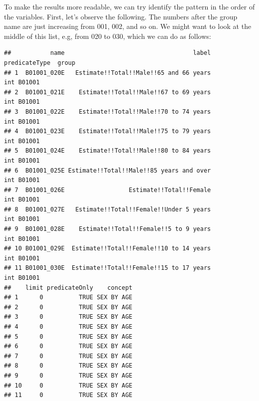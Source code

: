 \documentclass[openany]{book}
\newenvironment{Shaded}{\begin{snugshade}}{\end{snugshade}}
\newcommand{\DecValTok}[1]{\textcolor[rgb]{0.00,0.00,0.81}{#1}}
\newcommand{\KeywordTok}[1]{\textcolor[rgb]{0.13,0.29,0.53}{\textbf{#1}}}
\newcommand{\NormalTok}[1]{#1}
\newcommand{\OperatorTok}[1]{\textcolor[rgb]{0.81,0.36,0.00}{\textbf{#1}}}
\newcommand{\StringTok}[1]{\textcolor[rgb]{0.31,0.60,0.02}{#1}}
\begin{document}
To make the results more readable, we can try identify the pattern in the order of the variables. First, let's observe the following. The numbers after the group name are just increasing from 001, 002, and so on. We might want to look at the middle of this list, e.g, from 020 to 030, which we can do as follows:

\begin{Shaded}
\end{Shaded}

\begin{verbatim}
##           name                                    label predicateType  group
## 1  B01001_020E   Estimate!!Total!!Male!!65 and 66 years           int B01001
## 2  B01001_021E    Estimate!!Total!!Male!!67 to 69 years           int B01001
## 3  B01001_022E    Estimate!!Total!!Male!!70 to 74 years           int B01001
## 4  B01001_023E    Estimate!!Total!!Male!!75 to 79 years           int B01001
## 5  B01001_024E    Estimate!!Total!!Male!!80 to 84 years           int B01001
## 6  B01001_025E Estimate!!Total!!Male!!85 years and over           int B01001
## 7  B01001_026E                  Estimate!!Total!!Female           int B01001
## 8  B01001_027E   Estimate!!Total!!Female!!Under 5 years           int B01001
## 9  B01001_028E    Estimate!!Total!!Female!!5 to 9 years           int B01001
## 10 B01001_029E  Estimate!!Total!!Female!!10 to 14 years           int B01001
## 11 B01001_030E  Estimate!!Total!!Female!!15 to 17 years           int B01001
##    limit predicateOnly    concept
## 1      0          TRUE SEX BY AGE
## 2      0          TRUE SEX BY AGE
## 3      0          TRUE SEX BY AGE
## 4      0          TRUE SEX BY AGE
## 5      0          TRUE SEX BY AGE
## 6      0          TRUE SEX BY AGE
## 7      0          TRUE SEX BY AGE
## 8      0          TRUE SEX BY AGE
## 9      0          TRUE SEX BY AGE
## 10     0          TRUE SEX BY AGE
## 11     0          TRUE SEX BY AGE
\end{verbatim}
\end{document}
